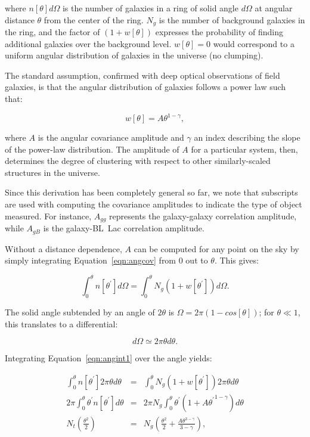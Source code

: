 \documentclass{emulateapj}
\begin{document}
\noindent where $n[\theta]d\Omega$ is the number of galaxies in a ring of solid angle $d\Omega$ at angular distance $\theta$ from the center of the ring. $N_g$ is the number of background galaxies in the ring, and the factor of $(1+w[\theta])$ expresses the probability of finding additional galaxies over the background level. $w[\theta]=0$ would correspond to a uniform angular distribution of galaxies in the universe (no clumping). 

The standard assumption, confirmed with deep optical observations of field galaxies, is that the angular distribution of galaxies follows a power law such that:

\begin{equation}
\label{eqn:wtheta}
w[\theta] = A\theta^{1-\gamma},
\end{equation}

\noindent where $A$ is the angular covariance amplitude and $\gamma$ an index describing the slope of the power-law distribution. The amplitude of $A$ for a particular system, then, determines the degree of clustering with respect to other similarly-scaled structures in the universe. 

Since this derivation has been completely general so far, we note that subscripts are used with computing the covariance amplitudes to indicate the type of object measured. For instance, $A_{gg}$ represents the galaxy-galaxy correlation amplitude, while $A_{gB}$ is the galaxy-BL~Lac correlation amplitude. 

Without a distance dependence, $A$ can be computed for any point on the sky by simply integrating Equation~\ref{eqn:angcov} from 0 out to $\theta$. This gives:

\begin{equation}
\label{eqn:angint1}
\int^\theta_0 n[\theta^\prime]d\Omega = \int^\theta_0 N_g (1 + w[\theta^\prime]) d\Omega.
\end{equation}

\noindent The solid angle subtended by an angle of $2\theta$ is $\Omega=2\pi(1-cos[\theta])$; for $\theta\ll1$, this translates to a differential:

\begin{equation}
d\Omega \simeq 2\pi \theta d\theta.
\end{equation}

\noindent Integrating Equation~\ref{eqn:angint1} over the angle yields:

\begin{eqnarray}
\int^\theta_0 n[\theta^\prime] 2 \pi \theta d\theta & = & \int^\theta_0 N_g (1 + w[\theta^\prime]) 2 \pi \theta d\theta \\
2\pi \int^\theta_0 \theta^\prime n[\theta^\prime]d\theta & = & 2 \pi N_g \int^\theta_0 \theta^\prime (1 + A {\theta^\prime}^{1-\gamma}) d\theta \\
N_t \left(\frac{\theta^2}{2}\right) & = & N_g \left(\frac{\theta^2}{2} + \frac{A\theta^{3-\gamma}}{3-\gamma}\right),
\end{eqnarray}
\end{document}
